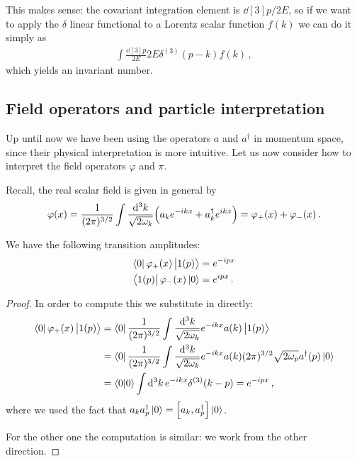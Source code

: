 \documentclass[main.tex]{subfiles}
\begin{document}
This makes sense: the covariant integration element is \(\dd[3]{p} / 2 E\), so if we want to apply the \(\delta \) linear functional to a Lorentz scalar function \(f(k)\) we can do it simply as 
%
\begin{align}
\int \frac{ \dd[3]{p}}{2E} 2 E \delta^{(3)} (p-k) f (k) 
\,,
\end{align}
%
which yields an invariant number.

\subsection{Field operators and particle interpretation}

Up until now we have been using the operators \(a\) and \(a ^\dag\) in momentum space, since their physical interpretation is more intuitive. 
Let us now consider how to interpret the field operators \(\varphi \) and \(\pi \). 

Recall, the real scalar field is given in general by 
%
\begin{align}
\varphi (x) = \frac{1}{(2 \pi )^{3/2}} 
\int \frac{ \dd[3]{k}}{\sqrt{2 \omega_{k}}}
\qty( a_k e^{-ikx} + a ^\dag_{k} e^{ikx}) = \varphi_{+} (x) + \varphi_{-} (x)
\,.
\end{align}

\begin{claim}
We have the following transition amplitudes: 
%
\begin{subequations}
\begin{align}
\bra{0} \varphi_{+} (x) \ket{1(p)} &= e^{-ipx} \\
\bra{1(p)} \varphi_{-} (x) \ket{0} &= e^{ipx}
\,.
\end{align}
\end{subequations}
\end{claim}

\begin{proof}
In order to compute this we substitute in directly:  
%
\begin{subequations}
\begin{align}
\bra{0} \varphi_{+} (x) \ket{1(p)} &=
\bra{0} \frac{1}{(2 \pi )^{3/2}} 
\int \frac{ \dd[3]{k}}{\sqrt{2 \omega_{k}}} 
e^{-ikx} a(k) \ket{1(p)}  \\
&= \bra{0} \frac{1}{(2 \pi )^{3/2}} 
\int \frac{ \dd[3]{k}}{\sqrt{2 \omega_{k}}} 
e^{-ikx} a(k) (2 \pi )^{3/2} \sqrt{2 \omega_{p}} a ^\dag (p) \ket{0}  \\
&= \braket{0}{0} \int \dd[3]{k} e^{-ikx} \delta^{(3)} (k-p) = e^{-ipx}
\,,
\end{align}
\end{subequations}
%
where we used the fact that \(a_k a ^\dag_p \ket{0} = \qty[a_k, a ^\dag_p] \ket{0}\).

For the other one the computation is similar: we work from the other direction.
\end{proof}
\end{document}
